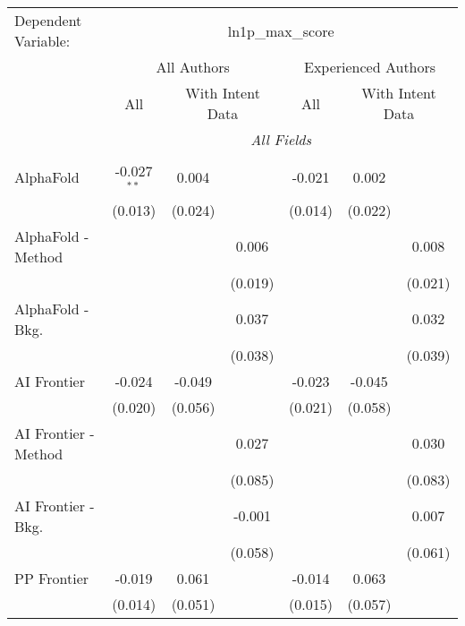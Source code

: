 \begingroup
\centering
\begin{tabular}{lcccccc}
   \tabularnewline \midrule \midrule
   Dependent Variable: & \multicolumn{6}{c}{ln1p\_max\_score}\\
 & \multicolumn{3}{c}{All Authors} & \multicolumn{3}{c}{Experienced Authors} \\
\cmidrule(lr){2-4} \cmidrule(lr){5-7}
 & \multicolumn{1}{c}{All} & \multicolumn{2}{c}{With Intent Data} & \multicolumn{1}{c}{All} & \multicolumn{2}{c}{With Intent Data} \\
\cmidrule(lr){2-2} \cmidrule(lr){3-4} \cmidrule(lr){5-5} \cmidrule(lr){6-7}
 & \multicolumn{6}{c}{\textit{All Fields}} \\ \\
   AlphaFold            & -0.027$^{**}$ & 0.004   &             & -0.021  & 0.002   &   \\   
                        & (0.013)       & (0.024) &             & (0.014) & (0.022) &   \\   
   AlphaFold - Method   &               &         & 0.006       &         &         & 0.008\\   
                        &               &         & (0.019)     &         &         & (0.021)\\   
   AlphaFold - Bkg.     &               &         & 0.037       &         &         & 0.032\\   
                        &               &         & (0.038)     &         &         & (0.039)\\   
   AI Frontier          & -0.024        & -0.049  &             & -0.023  & -0.045  &   \\   
                        & (0.020)       & (0.056) &             & (0.021) & (0.058) &   \\   
   AI Frontier - Method &               &         & 0.027       &         &         & 0.030\\   
                        &               &         & (0.085)     &         &         & (0.083)\\   
   AI Frontier - Bkg.   &               &         & -0.001      &         &         & 0.007\\   
                        &               &         & (0.058)     &         &         & (0.061)\\   
   PP Frontier          & -0.019        & 0.061   &             & -0.014  & 0.063   &   \\   
                        & (0.014)       & (0.051) &             & (0.015) & (0.057) &   \\   

\end{tabular}
